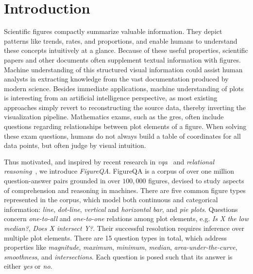 \documentclass{article} %
\begin{document}
\section{Introduction}
Scientific figures compactly summarize valuable information. They depict patterns like trends, rates, and proportions, and enable humans to understand these concepts intuitively at a glance.
Because of these useful properties, scientific papers and other documents often supplement textual information with figures.
Machine understanding of this structured visual information could assist human analysts in extracting knowledge from the vast documentation produced by modern science. 
Besides immediate applications, machine understanding of plots is interesting from an artificial intelligence perspective, as most existing approaches simply revert to reconstructing the source data, thereby inverting the visualization pipeline. Mathematics exams, such as the \glspl{gre}, often include questions regarding relationships between plot elements of a figure. When solving these exam questions, humans do not always build a table of coordinates for all data points, but often judge by visual intuition.

Thus motivated, and inspired by recent research in \emph{\gls{vqa}}~\citep{antol2015vqa,goyal2016making} and \emph{relational reasoning}~\citep{johnson2016clevr,suhr2017corpus}, we introduce \emph{FigureQA}.
FigureQA is a corpus of over one million question-answer pairs grounded in over $100,000$ figures, devised to study aspects of comprehension and reasoning in machines.
There are five common figure types represented in the corpus, which model both continuous and categorical information: \emph{line}, \emph{dot-line}, \emph{vertical} and \emph{horizontal bar}, and \emph{pie plots}.
Questions concern \emph{one-to-all} and \emph{one-to-one} relations among plot elements, e.g. \emph{Is X the low median?}, \emph{Does X intersect Y?}. Their successful resolution requires inference over multiple plot elements.
There are 15 question types in total, which address properties like \emph{magnitude}, \emph{maximum}, \emph{minimum}, \emph{median}, \emph{area-under-the-curve}, \emph{smoothness}, and \emph{intersections}. Each question is posed such that its answer is either \emph{yes} or \emph{no}.
\end{document}
